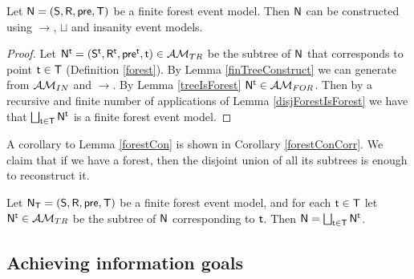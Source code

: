\begin{lemma} \label{forestCon}
Let $\evM = (\evS, \evR, \evpr, \evT)$ be a finite forest event model.
Then $\evM$ can be constructed using $\to$, $\sqcup$ and insanity event models.
\end{lemma}

\begin{proof}
Let $\evM^\evt = (\evS^\evt, \evR^\evt, \evpr^\evt, \evt) \in \treeClass$ be the
subtree of $\evM$ that corresponds to point $\evt \in \evT$ (Definition \ref{forest}).
By Lemma \ref{finTreeConstruct} we can generate from $\insaneClass$ and $\to$.
By Lemma \ref{treeIsForest} $\evM^\evt \in \forestClass$.
Then by a recursive and finite number of applications of Lemma
\ref{disjForestIsForest} we have that $\bigsqcup_{\evt \in \evT} \evM^\evt$ is a finite
forest event model.
\end{proof}

A corollary to Lemma \ref{forestCon} is shown in Corollary \ref{forestConCorr}.
We claim that if we have a forest, then the disjoint union of all its subtrees is enough to
reconstruct it.

\begin{corr} \label{forestConCorr}
Let $\evM_\evT = (\evS, \evR, \evpr, \evT)$ be a finite forest event model, and for each $\evt \in \evT$ let $\evM^\evt \in
\treeClass$ be the subtree of $\evM$ corresponding to $\evt$.
Then $\evM = \bigsqcup_{\evt \in \evT} \evM^\evt$.
\end{corr}

\subsection{Achieving information goals} \label{subsec:multi:achievingGoals}


